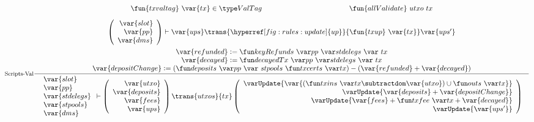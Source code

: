 \begin{figure}[htb]
  \begin{equation}
    \inference[Scripts-Val]
    {
    \fun{txvaltag}~\var{tx} \in \ValTag  &
    \fun{allValidate}~{utxo}~{tx}
    \\
    ~
    \\
    {
      \left(
        \begin{array}{r}
          \var{slot} \\
          \var{pp} \\
          \var{dms} \\
        \end{array}
      \right)
    }
    \vdash \var{ups} \trans{\hyperref[fig:rules:update]{up}}{\fun{txup}~\var{tx}} \var{ups'}
    \\~\\
    \var{refunded} \leteq \keyRefunds{pp}{stdelegs}~{tx}
    \\
    \var{decayed} \leteq \decayedTx{pp}{stdelegs}~{tx}
    \\
    \var{depositChange} \leteq
      (\deposits{pp}~{stpools}~{\txcerts{tx}}) - (\var{refunded} + \var{decayed})
    }
    {
    \begin{array}{l}
      \var{slot}\\
      \var{pp}\\
      \var{stdelegs}\\
      \var{stpools}\\
      \var{dms}\\
    \end{array}
      \vdash
      \left(
      \begin{array}{r}
        \var{utxo} \\
        \var{deposits} \\
        \var{fees} \\
        \var{ups} \\
      \end{array}
      \right)
      \trans{utxos}{tx}
      \left(
      \begin{array}{r}
        \varUpdate{\var{(\txins{tx} \subtractdom \var{utxo}) \cup \outs{tx}}}  \\
        \varUpdate{\var{deposits} + \var{depositChange}} \\
        \varUpdate{\var{fees} + \txfee{tx} + \var{decayed}} \\
        \varUpdate{\var{ups'}} \\
      \end{array}
      \right) \\
}
\end{equation}
\end{figure}
